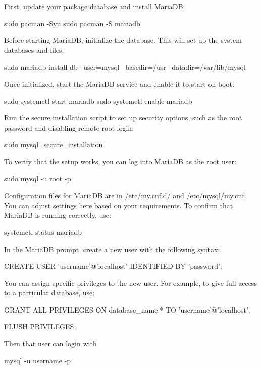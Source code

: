 \documentclass{report}
\begin{document}
    \pagebreak 
    \bigbreak \noindent 
    First, update your package database and install MariaDB:
    \bigbreak \noindent 
    \begin{bashcode}
        sudo pacman -Syu
        sudo pacman -S mariadb
    \end{bashcode}
    \bigbreak \noindent 
    Before starting MariaDB, initialize the database. This will set up the system databases and files.
    \bigbreak \noindent 
    \begin{bashcode}
    sudo mariadb-install-db --user=mysql --basedir=/usr --datadir=/var/lib/mysql
    \end{bashcode}
    \bigbreak \noindent 
    Once initialized, start the MariaDB service and enable it to start on boot:
    \bigbreak \noindent 
    \begin{bashcode}
        sudo systemctl start mariadb
        sudo systemctl enable mariadb
    \end{bashcode}
    \bigbreak \noindent 
    Run the secure installation script to set up security options, such as the root password and disabling remote root login:
    \bigbreak \noindent 
    \begin{bashcode}
    sudo mysql_secure_installation
    \end{bashcode}
    \bigbreak \noindent 
    To verify that the setup works, you can log into MariaDB as the root user:
    \bigbreak \noindent 
    \begin{bashcode}
    sudo mysql -u root -p
    \end{bashcode}
    \bigbreak \noindent 
    Configuration files for MariaDB are in /etc/my.cnf.d/ and /etc/mysql/my.cnf. You can adjust settings here based on your requirements.
    \bigbreak \noindent 
    To confirm that MariaDB is running correctly, use:
    \begin{bashcode}
        systemctl status mariadb
    \end{bashcode}
    \bigbreak \noindent 
    In the MariaDB prompt, create a new user with the following syntax:
    \bigbreak \noindent 
    \begin{bashcode}
    CREATE USER 'username'@'localhost' IDENTIFIED BY 'password';
    \end{bashcode}
    \bigbreak \noindent 
    You can assign specific privileges to the new user. For example, to give full access to a particular database, use:
    \begin{bashcode}
    GRANT ALL PRIVILEGES ON database_name.* TO 'username'@'localhost';

    FLUSH PRIVILEGES;
    \end{bashcode}
    \bigbreak \noindent 
    Then that user can login with
    \bigbreak \noindent 
    \begin{bashcode}
    mysql -u username -p
    \end{bashcode}
\end{document}

